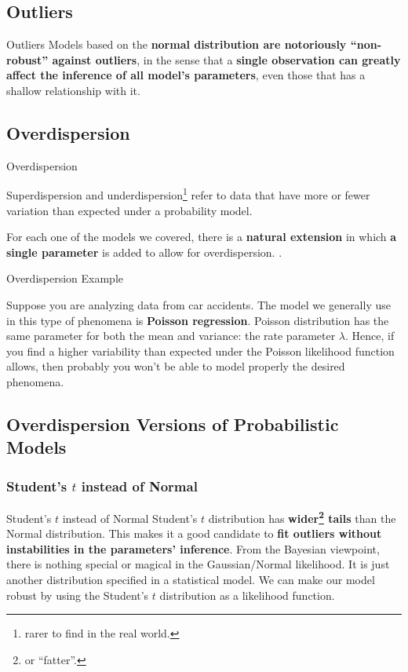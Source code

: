 \subsection{Outliers}
\begin{frame}{Outliers}
	Models based on the \textbf{normal distribution are notoriously ``non-robust''
		against outliers},
	in the sense that a \textbf{single observation can greatly affect the
		inference of all model's parameters},
	even those that has a shallow relationship with it.
\end{frame}

\subsection{Overdispersion}
\begin{frame}{Overdispersion}
	\begin{defn}
		Superdispersion and underdispersion\footnote{
			rarer to find in the real world.}
		refer to data that have more or fewer variation than expected
		under a probability model.
		\parencite{gelman2020regression}
	\end{defn}
	\vfill
	For each one of the models we covered, there is a \textbf{natural extension}
	in which \textbf{a single parameter} is added to allow for overdispersion.
	\parencite{gelman2013bayesian}.
\end{frame}

\begin{frame}{Overdispersion Example}
	\begin{example}
		Suppose you are analyzing data from car accidents.
		The model we generally use in this type of phenomena is
		\textbf{Poisson regression}.
		\vfill
		Poisson distribution has the same parameter for both the mean and variance:
		the rate parameter $\lambda$.
		\vfill
		Hence, if you find a higher variability than expected under the
		Poisson likelihood function allows,
		then probably you won't be able to model properly the desired phenomena.
	\end{example}
\end{frame}

\subsection{Overdispersion Versions of Probabilistic Models}
\subsubsection{Student's $t$ instead of Normal}
\begin{frame}{Student's $t$ instead of Normal}
	Student's $t$ distribution has \textbf{wider\footnote{or ``fatter''.} tails}
	than the Normal distribution.
	\vfill
	This makes it a good candidate to \textbf{fit outliers without
		instabilities in the parameters' inference}.
	\vfill
	From the Bayesian viewpoint, there is nothing special or magical in the
	Gaussian/Normal likelihood.
	It is just another distribution specified in a statistical model.
	We can make our model robust by using the Student's $t$ distribution
	as a likelihood function.
\end{frame}

